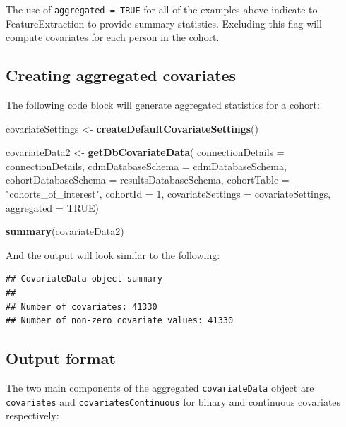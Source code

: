 \documentclass[11pt]{book}
\newenvironment{Shaded}{\begin{snugshade}}{\end{snugshade}}
\newcommand{\DataTypeTok}[1]{\textcolor[rgb]{0.13,0.29,0.53}{#1}}
\newcommand{\DecValTok}[1]{\textcolor[rgb]{0.00,0.00,0.81}{#1}}
\newcommand{\KeywordTok}[1]{\textcolor[rgb]{0.13,0.29,0.53}{\textbf{#1}}}
\newcommand{\NormalTok}[1]{#1}
\newcommand{\OtherTok}[1]{\textcolor[rgb]{0.56,0.35,0.01}{#1}}
\newcommand{\StringTok}[1]{\textcolor[rgb]{0.31,0.60,0.02}{#1}}
\theoremstyle{definition}
\theoremstyle{definition}
\theoremstyle{definition}
\theoremstyle{remark}
\let\BeginKnitrBlock\begin \let\EndKnitrBlock\end
\begin{document}
\BeginKnitrBlock{rmdimportant}
The use of \texttt{aggregated\ =\ TRUE} for all of the examples above indicate to FeatureExtraction to provide summary statistics. Excluding this flag will compute covariates for each person in the cohort.
\EndKnitrBlock{rmdimportant}

\hypertarget{creating-aggregated-covariates}{%
\subsection{Creating aggregated covariates}\label{creating-aggregated-covariates}}

The following code block will generate aggregated statistics for a cohort:

\begin{Shaded}
\begin{Highlighting}[]
\NormalTok{covariateSettings <-}\StringTok{ }\KeywordTok{createDefaultCovariateSettings}\NormalTok{() }

\NormalTok{covariateData2 <-}\StringTok{ }\KeywordTok{getDbCovariateData}\NormalTok{(}
  \DataTypeTok{connectionDetails =}\NormalTok{ connectionDetails, }
  \DataTypeTok{cdmDatabaseSchema =}\NormalTok{ cdmDatabaseSchema, }
  \DataTypeTok{cohortDatabaseSchema =}\NormalTok{ resultsDatabaseSchema, }
  \DataTypeTok{cohortTable =} \StringTok{"cohorts_of_interest"}\NormalTok{, }
  \DataTypeTok{cohortId =} \DecValTok{1}\NormalTok{, }
  \DataTypeTok{covariateSettings =}\NormalTok{ covariateSettings, }
  \DataTypeTok{aggregated =} \OtherTok{TRUE}\NormalTok{) }

\KeywordTok{summary}\NormalTok{(covariateData2) }
\end{Highlighting}
\end{Shaded}

And the output will look similar to the following:

\begin{verbatim}
## CovariateData object summary 
## 
## Number of covariates: 41330 
## Number of non-zero covariate values: 41330
\end{verbatim}

\hypertarget{output-format}{%
\subsection{Output format}\label{output-format}}

The two main components of the aggregated \texttt{covariateData} object are \texttt{covariates} and \texttt{covariatesContinuous} for binary and continuous covariates respectively:
\end{document}
